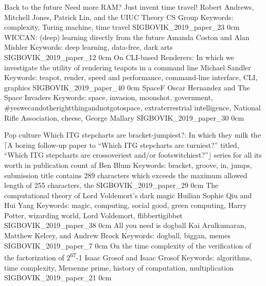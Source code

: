 \addtrack
	{}{Back to the future}
\addpaper
	{Need more RAM? Just invent time travel!}
	{Robert Andrews, Mitchell Jones, Patrick Lin, and the UIUC Theory CS Group}
	{Keywords: complexity, Turing machine, time travel}
	{SIGBOVIK_2019_paper_23}
	{0cm}
	{}
\addpaper
	{WICCAN: (deep) learning directly from the future}
	{Amanda Coston and Alan Mishler}
	{Keywords: deep learning, data-free, dark arts}
	{SIGBOVIK_2019_paper_12}
	{0cm}
	{}
\addpaper
	{On CLI-based Renderers: In which we investigate the utility of rendering teapots in a command line}
	{Michael Sandler}
	{Keywords: teapot, render, speed and performance, command-line interface, CLI, graphics}
	{SIGBOVIK_2019_paper_40}
	{0cm}
	{}
\addpaper
	{SpaceF}
	{Oscar Hernandez and The Space Invaders}
	{Keywords: space, invasion, moonshot, government, \#yeswecandotherightthingandnotgotospace, extraterrestrial intelligence, National Rifle Association, cheese, George Mallary}
	{SIGBOVIK_2019_paper_30}
	{0cm}
	{}

\addtrack
	{}{Pop culture}
\addpaper
	{Which ITG stepcharts are bracket-jumpiest?: In which they milk the $\lceil$A boring follow-up paper to ``Which ITG stepcharts are turniest?'' titled, ``Which ITG stepcharts are crossoveriest and/or footswitchiest?''$\rfloor$ series for all its worth in publication count af}
	{Ben Blum}
	{Keywords: bracket, groove, in, jumps, submission title contains 289 characters which exceeds the maximum allowed length of 255 characters, the}
	{SIGBOVIK_2019_paper_29}
	{0cm}
	{}
\addpaper
	{The computational theory of Lord Voldemort's dark magic}
	{Huilian Sophie Qiu and Hui Yang}
	{Keywords: magic, computing, social good, green computing, Harry Potter, wizarding world, Lord Voldemort, flibbertigibbet}
	{SIGBOVIK_2019_paper_38}
	{0cm}
	{}
\addpaper
	{All you need is dogball}
	{Kai Arulkumaran, Matthew Kelcey, and Andrew Brock}
	{Keywords: dogball, biggan, memes}
	{SIGBOVIK_2019_paper_7}
	{0cm}
	{}
\addpaper
	{On the time complexity of the verification of the factorization of 2\textsuperscript{67}-1}
	{Isaac Grosof and Isaac Grosof}
	{Keywords: algorithms, time complexity, Mersenne prime, history of computation, multiplication}
	{SIGBOVIK_2019_paper_21}
	{0cm}
	{}
